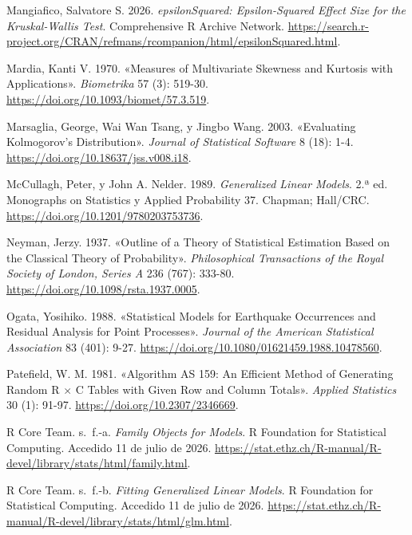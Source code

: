 \documentclass[
  spanish,
  letterpaper,
  DIV=11,
  numbers=noendperiod]{scrartcl}
\newlength{\cslhangindent}
\newenvironment{CSLReferences}[2] %
 {\begin{list}{}{%
  \setlength{\itemindent}{0pt}
  \setlength{\leftmargin}{0pt}
  \setlength{\parsep}{0pt}
  \ifodd #1
   \setlength{\leftmargin}{\cslhangindent}
   \setlength{\itemindent}{-1\cslhangindent}
  \fi
  \setlength{\itemsep}{#2\baselineskip}}}
 {\end{list}}
\begin{document}
\begin{CSLReferences}{1}{1}
Mangiafico, Salvatore S. 2026. \emph{epsilonSquared: Epsilon-Squared
Effect Size for the Kruskal-Wallis Test}. Comprehensive R Archive
Network.
\url{https://search.r-project.org/CRAN/refmans/rcompanion/html/epsilonSquared.html}.

Mardia, Kanti V. 1970. {«Measures of Multivariate Skewness and Kurtosis
with Applications»}. \emph{Biometrika} 57 (3): 519-30.
\url{https://doi.org/10.1093/biomet/57.3.519}.

Marsaglia, George, Wai Wan Tsang, y Jingbo Wang. 2003. {«Evaluating
Kolmogorov's Distribution»}. \emph{Journal of Statistical Software} 8
(18): 1-4. \url{https://doi.org/10.18637/jss.v008.i18}.

McCullagh, Peter, y John A. Nelder. 1989. \emph{Generalized Linear
Models}. 2.ª ed. Monographs on Statistics y Applied Probability 37.
Chapman; Hall/CRC. \url{https://doi.org/10.1201/9780203753736}.

Neyman, Jerzy. 1937. {«Outline of a Theory of Statistical Estimation
Based on the Classical Theory of Probability»}. \emph{Philosophical
Transactions of the Royal Society of London, Series A} 236 (767):
333-80. \url{https://doi.org/10.1098/rsta.1937.0005}.

Ogata, Yosihiko. 1988. {«Statistical Models for Earthquake Occurrences
and Residual Analysis for Point Processes»}. \emph{Journal of the
American Statistical Association} 83 (401): 9-27.
\url{https://doi.org/10.1080/01621459.1988.10478560}.

Patefield, W. M. 1981. {«Algorithm AS 159: An Efficient Method of
Generating Random R \(\times\) C Tables with Given Row and Column
Totals»}. \emph{Applied Statistics} 30 (1): 91-97.
\url{https://doi.org/10.2307/2346669}.

R Core Team. s.~f.-a. \emph{Family Objects for Models}. R Foundation for
Statistical Computing. Accedido 11 de julio de 2026.
\url{https://stat.ethz.ch/R-manual/R-devel/library/stats/html/family.html}.

R Core Team. s.~f.-b. \emph{Fitting Generalized Linear Models}. R
Foundation for Statistical Computing. Accedido 11 de julio de 2026.
\url{https://stat.ethz.ch/R-manual/R-devel/library/stats/html/glm.html}.


\end{CSLReferences}
\end{document}
